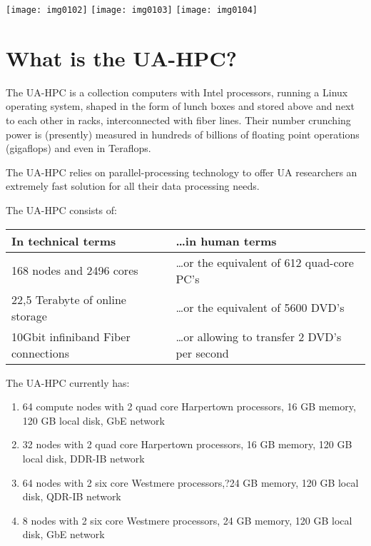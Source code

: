 \texttt{[image: img0102]}
\texttt{[image: img0103]}
\texttt{[image: img0104]}

\section{What is the UA-HPC?}

The UA-HPC is a collection computers with Intel processors, running a Linux
operating system, shaped in the form of lunch boxes and stored above and next
to each other in racks, interconnected with fiber lines. Their number crunching
power is (presently) measured in hundreds of billions of floating point
operations (gigaflops) and even in Teraflops.

The UA-HPC relies on parallel-processing technology to offer UA researchers an
extremely fast solution for all their data processing needs.

The UA-HPC consists of:

\begin{tabular}{|p{1.8in}|p{2.1in}|} \hline
\textbf{In technical terms} & \textbf{\dots  in human terms} \\ \hline
168 nodes and 2496 cores & \dots  or the equivalent of 612 quad-core PC's \\ \hline
22,5 Terabyte of online storage & \dots  or the equivalent of 5600 DVD's \\ \hline
10Gbit infiniband Fiber connections & \dots  or allowing to transfer 2 DVD's per second \\ \hline
\end{tabular}

The UA-HPC currently has:

\begin{enumerate}
\item  64 compute nodes with 2 quad core Harpertown processors, 16 GB memory, 120 GB local disk, GbE network
\item  32 nodes with 2 quad core Harpertown processors, 16 GB memory, 120 GB local disk, DDR-IB network
\item  64 nodes with 2 six core Westmere processors,?24 GB memory, 120 GB local disk, QDR-IB network
\item  8 nodes with 2 six core Westmere processors, 24 GB memory, 120 GB local disk, GbE network
\end{enumerate}

